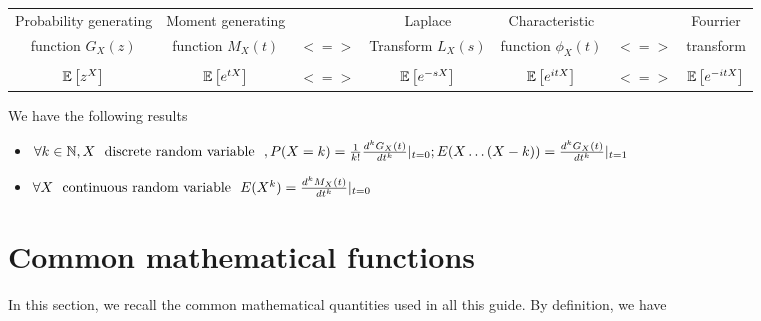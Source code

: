 \begin{center}
\begin{tabular}{|c|ccc|ccc|}

\hline
 Probability generating & Moment generating & & Laplace & Characteristic & & Fourrier\\
 function $G_X(z)$ & function $M_X(t)$ & $<=>$ & Transform $L_X(s)$ & function $\phi_X(t)$ & $<=>$ & transform \\
 \hline
 	&	&	&   & & &	\\
 $\mathbb{E}\left[ z^X \right]$ &   $\mathbb{E}\left[ e^{tX} \right]$ & $<=>$ & $\mathbb{E}\left[ e^{-sX} \right]$  & $ \mathbb{E}\left[ e^{itX} \right]$ & $<=>$ & $ \mathbb{E}\left[ e^{-itX} \right]$\\
\hline
\end{tabular}
\end{center}

We have the following results
\begin{itemize}
\item $ \forall k \in \mathbb{N}, X \textrm{~~discrete random variable~~}, P(X=k) = \frac{1}{k!}\frac{d^k G_X(t)}{dt^k}|_{t=0} ;  E(X\dots(X-k)) =  \frac{d^k G_X(t)}{dt^k}|_{t=1}$
\item $ \forall  X \textrm{~~continuous random variable~~} E(X^k) = \frac{d^k M_X(t)}{dt^k}|_{t=0}$
\end{itemize}


\section{Common mathematical functions}\label{mathfun}
In this section, we recall the common mathematical quantities used in all this guide. By definition, we have


